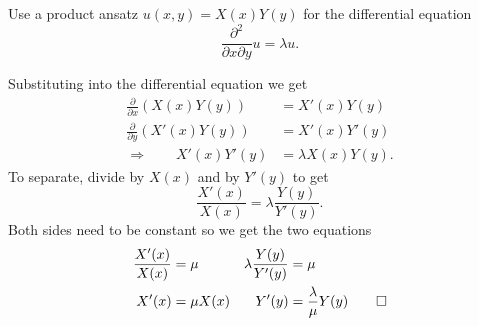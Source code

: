 Use a product ansatz $u(x,y) = X(x)Y(y)$ 
for the differential equation
\[
\frac{\partial^2}{\partial x \partial y} u
=
\lambda u.
\]

\begin{loesung}
Substituting into the differential equation we get
\begin{align*}
\frac{\partial}{\partial x} (X(x)Y(y))
&=
X'(x) Y(y)
\\
\frac{\partial}{\partial y} (X'(x)Y(y))
&=
X'(x)Y'(y)
\\
\Rightarrow\qquad
X'(x) Y'(y) &= \lambda X(x) Y(y).
\end{align*}
To separate, divide by $X(x)$ and by $Y'(y)$ to get
\[
\frac{X'(x)}{X(x)}
=
\lambda
\frac{Y(y)}{Y'(y)}.
\]
Both sides need to be constant so we get the two equations
\begin{align*}
\frac{X'(x)}{X(x)}&=\mu
&
\lambda\frac{Y(y)}{Y'(y)}&=\mu
\\
X'(x)&=\mu X(x)
&
Y'(y)&=\frac{\lambda}{\mu}Y(y)
\qedhere
\end{align*}
\end{loesung}
